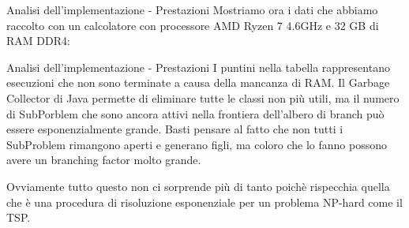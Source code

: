 \documentclass[10pt]{beamer}
\begin{document}
\begin{frame}{Analisi dell'implementazione - Prestazioni}
Mostriamo ora i dati che abbiamo raccolto con un calcolatore con processore AMD Ryzen 7 4.6GHz e 32 GB di RAM DDR4:
    \begin{center}
\end{center}


\end{frame}

\begin{frame}{Analisi dell'implementazione - Prestazioni}
    I puntini nella tabella rappresentano esecuzioni che non sono terminate a causa della mancanza di RAM. Il {\selectfont Garbage Collector} di Java permette di eliminare tutte le classi non più utili, ma il numero di {\selectfont SubPorblem} che sono ancora attivi nella frontiera dell'albero di branch può essere esponenzialmente grande. Basti pensare al fatto che non tutti i {\selectfont SubProblem} rimangono aperti e generano figli, ma coloro che lo fanno possono avere un branching factor molto grande.
    
    
    Ovviamente tutto questo non ci sorprende più di tanto poichè rispecchia quella che è una procedura di risoluzione esponenziale per un problema NP-hard come il TSP.
\end{frame}
\end{document}
